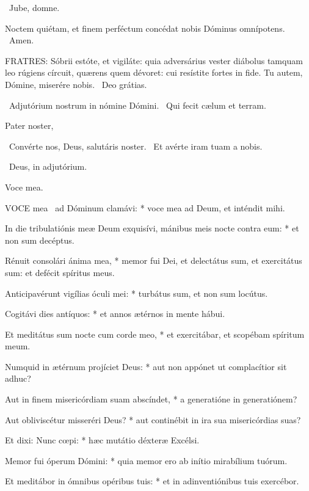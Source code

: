 
\V\ Jube, domne.

 Noctem quiétam, et finem perféctum concédat nobis Dóminus omnípotens. \R\ Amen.


\lettrine[lines=2]{F}{RATRES}: Sóbrii estóte, et vigiláte: quia adversárius vester diábolus tamquam leo rúgiens círcuit, quærens quem dévoret: cui resístite fortes in fide. Tu autem, Dómine, miserére nobis. \R\ Deo grátias.

\V\ Adjutórium nostrum in nómine Dómini. \R\ Qui fecit cælum et terram.

Pater noster, 


\V\ Convérte nos, Deus, salutáris noster. \R\ Et avérte iram tuam a nobis.

\V\ Deus, in adjutórium.

 Voce mea. \dag


\lettrine[lines=2]{V}{OCE} mea \dag\ ad Dóminum clamávi: * voce mea ad Deum, et inténdit mihi.

In die tribulatiónis meæ Deum exquisívi, mánibus meis nocte contra eum: * et non sum decéptus.

Rénuit consolári ánima mea, * memor fui Dei, et delectátus sum, et exercitátus sum: et defécit spíritus meus.

Anticipavérunt vigílias óculi mei: * turbátus sum, et non sum locútus.

Cogitávi dies antíquos: * et annos ætérnos in mente hábui.

Et meditátus sum nocte cum corde meo, * et exercitábar, et scopébam spíritum meum.

Numquid in ætérnum projíciet Deus: * aut non appónet ut complacítior sit adhuc?

Aut in finem misericórdiam suam abscíndet, * a generatióne in generatiónem?

Aut obliviscétur misseréri Deus? * aut continébit in ira sua misericórdias suas?

Et dixi: Nunc cœpi: * hæc mutátio déxteræ Excélsi.

Memor fui óperum Dómini: * quia memor ero ab inítio mirabílium tuórum.

Et meditábor in ómnibus opéribus tuis: * et in adinventiónibus tuis exercébor.

